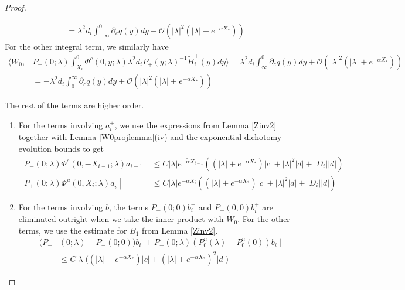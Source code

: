 \documentclass[thesis.tex]{subfiles}
\begin{document}
\begin{lemma}
\begin{proof}
\begin{enumerate}
\begin{align*}
&= \lambda^2 d_i \int_{-\infty}^0 \partial_c q(y)dy + \mathcal{O}(|\lambda|^2( |\lambda| + e^{-\alpha X_*})) 
\end{align*}
For the other integral term, we similarly have
\begin{align*}
\langle W_0, &P_+(0; \lambda) \int_{X_i}^0 \Phi^c(0, y; \lambda) \lambda^2 d_i P_+(y; \lambda)^{-1} \tilde{H}_i^+(y) dy \rangle = \lambda^2 d_i \int_{\infty}^0 \partial_c q(y)dy + \mathcal{O}(|\lambda|^2( |\lambda| + e^{-\alpha X_*})) \\
&= -\lambda^2 d_i \int_0^{\infty} \partial_c q(y)dy + \mathcal{O}(|\lambda|^2( |\lambda| + e^{-\alpha X_*}))
\end{align*}
\end{enumerate}

The rest of the terms are higher order.
\begin{enumerate}

\item For the terms involving $a_i^\pm$, we use the expressions from Lemma \ref{Zinv2} together with Lemma \ref{W0projlemma}(iv) and the exponential dichotomy evolution bounds to get
\begin{align*}
|P_-(0; \lambda) \Phi^s(0, -X_{i-1}; \lambda) a_{i-1}^-| &\leq C |\lambda| e^{-\tilde{\alpha} X_{i-1}} \left( (|\lambda| + e^{-\alpha X_*})|c| + |\lambda|^2 |d| + |D_i||d| \right) \\
|P_+(0; \lambda) \Phi^u(0, X_i; \lambda) a_i^+| &\leq C |\lambda| e^{-\tilde{\alpha} X_i}\left( (|\lambda| + e^{-\alpha X_*})|c| + |\lambda|^2 |d| + |D_i||d| \right) 
\end{align*} 

\item For the terms involving $b$, the terms $P_-(0; 0) b_i^-$ and $P_+(0, 0)b_i^+$ are eliminated outright when we take the inner product with $W_0$. For the other terms, we use the estimate for $B_1$ from Lemma \ref{Zinv2}.
\begin{align*}
|(P_-&(0; \lambda) - P_-(0; 0))b_i^- + P_-(0; \lambda)(P_0^u(\lambda) - P_0^u(0))b_i^-| \\
&\leq C |\lambda|\Big( (|\lambda| + e^{-\alpha X_*})|c| + (|\lambda| + e^{-\alpha X_*})^2 |d| \Big)
\end{align*}


\end{enumerate}
\end{proof}
\end{lemma}
\end{document}
